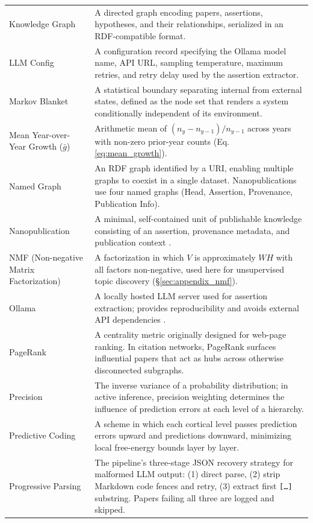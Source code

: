 \documentclass[
  english,
]{article}
\begin{document}
\begin{longtable}{p{4cm}p{11cm}}
Knowledge Graph & A directed graph encoding papers, assertions, hypotheses, and their relationships, serialized in an RDF-compatible format. \\
LLM Config & A configuration record specifying the Ollama model name, API URL, sampling temperature, maximum retries, and retry delay used by the assertion extractor. \\
Markov Blanket & A statistical boundary separating internal from external states, defined as the node set that renders a system conditionally independent of its environment. \\
Mean Year-over-Year Growth ($\bar{g}$) & Arithmetic mean of $(n_y - n_{y-1})/n_{y-1}$ across years with non-zero prior-year counts (Eq. \ref{eq:mean_growth}). \\
Named Graph & An RDF graph identified by a URI, enabling multiple graphs to coexist in a single dataset. Nanopublications use four named graphs (Head, Assertion, Provenance, Publication Info). \\
Nanopublication & A minimal, self-contained unit of publishable knowledge consisting of an assertion, provenance metadata, and publication context \citep{groth2010anatomy, kuhn2016decentralized}. \\
NMF (Non-negative Matrix Factorization) & A factorization in which $V$ is approximately $W H$ with all factors non-negative, used here for unsupervised topic discovery (\S\ref{sec:appendix_nmf}). \\
Ollama & A locally hosted LLM server used for assertion extraction; provides reproducibility and avoids external API dependencies \citep{ollama2024}. \\
PageRank & A centrality metric originally designed for web-page ranking. In citation networks, PageRank surfaces influential papers that act as hubs across otherwise disconnected subgraphs. \\
Precision & The inverse variance of a probability distribution; in active inference, precision weighting determines the influence of prediction errors at each level of a hierarchy. \\
Predictive Coding & A scheme in which each cortical level passes prediction errors upward and predictions downward, minimizing local free-energy bounds layer by layer. \\
Progressive Parsing & The pipeline's three-stage JSON recovery strategy for malformed LLM output: (1) direct parse, (2) strip Markdown code fences and retry, (3) extract first \texttt{[\ldots]} substring. Papers failing all three are logged and skipped. \\

\end{longtable}
\end{document}
